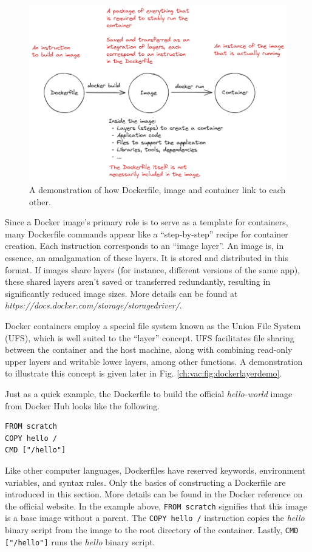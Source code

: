 \begin{figure}
	\centering
	\includegraphics[width=350pt]{chapters/ch-virtualization-and-containerization/figures/dockerfiletoimage.png}
	\caption{A demonstration of how Dockerfile, image and container link to each other.} \label{ch:vac:fig:dockerfiletoimage}
\end{figure}

Since a Docker image's primary role is to serve as a template for containers, many Dockerfile commands appear like a ``step-by-step'' recipe for container creation. Each instruction corresponds to an ``image layer''. An image is, in essence, an amalgamation of these layers. It is stored and distributed in this format. If images share layers (for instance, different versions of the same app), these shared layers aren't saved or transferred redundantly, resulting in significantly reduced image sizes. More details can be found at \textit{https://docs.docker.com/storage/storagedriver/}.

Docker containers employ a special file system known as the Union File System (UFS), which is well suited to the ``layer'' concept. UFS facilitates file sharing between the container and the host machine, along with combining read-only upper layers and writable lower layers, among other functions. A demonstration to illustrate this concept is given later in Fig. \ref{ch:vac:fig:dockerlayerdemo}.

Just as a quick example, the Dockerfile to build the official \textit{hello-world} image from Docker Hub looks like the following.
\begin{lstlisting}
FROM scratch
COPY hello /
CMD ["/hello"]
\end{lstlisting}
Like other computer languages, Dockerfiles have reserved keywords, environment variables, and syntax rules. Only the basics of constructing a Dockerfile are introduced in this section. More details can be found in the Docker reference on the official website. In the example above, \verb|FROM scratch| signifies that this image is a base image without a parent. The \verb|COPY hello /| instruction copies the \textit{hello} binary script from the image to the root directory of the container. Lastly, \verb|CMD ["/hello"]| runs the \textit{hello} binary script.

